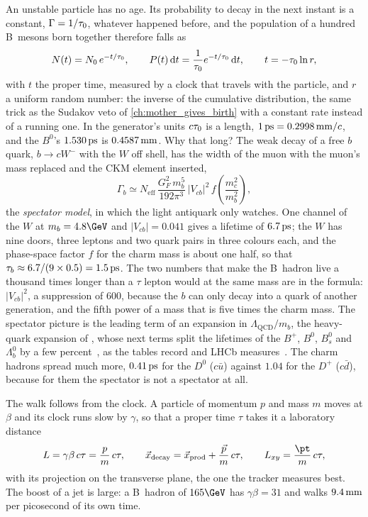 An unstable particle has no age. Its probability to decay in the next
instant is a constant, $\Gamma=1/\tau_0$, whatever happened before, and the
population of a hundred B~mesons born together therefore falls as
\begin{equation}
  N(t)=N_0\,e^{-t/\tau_0},\qquad
  P(t)\,\mathrm{d}t=\frac{1}{\tau_0}e^{-t/\tau_0}\,\mathrm{d}t,\qquad
  t=-\tau_0\ln r,
  \label{eq:children_producing_grandchildren:decay_law}
\end{equation}
with $t$ the proper time, measured by a clock that travels with the
particle, and $r$ a uniform random number: the inverse of the cumulative
distribution, the same trick as the Sudakov veto of
\cref{ch:mother_gives_birth} with a constant rate instead of a running
one. In the generator's units $c\tau_0$ is a length, $1\,\mathrm{ps}=0.2998\,\mathrm{mm}/c$,
and the $B^0$'s $1.530\,\mathrm{ps}$ is $0.4587\,\mathrm{mm}$. Why that long? The weak decay of
a free $b$ quark, $b\to cW^-$ with the $W$ off shell, has the width of the
muon with the muon's mass replaced and the CKM element inserted,
\begin{equation}
  \Gamma_b\simeq N_{\mathrm{eff}}\,\frac{G_F^2\,m_b^5}{192\pi^3}\,|V_{cb}|^2\,f\!\left(\frac{m_c^2}{m_b^2}\right),
  \label{eq:children_producing_grandchildren:spectator}
\end{equation}
the \emph{spectator model}, in which the light antiquark only watches.
One channel of the $W$ at $m_b=4.8\GeV$ and $|V_{cb}|=0.041$ gives a
lifetime of $6.7\,\mathrm{ps}$; the $W$ has nine doors, three leptons and two quark
pairs in three colours each, and the phase-space factor $f$ for the charm
mass is about one half, so that $\tau_b\approx6.7/(9\times0.5)=1.5\,\mathrm{ps}$.
The two numbers that make the B~hadron live a thousand times longer than
a $\tau$ lepton would at the same mass are in the formula: $|V_{cb}|^2$,
a suppression of $600$, because the $b$ can only decay into a quark of
another generation, and the fifth power of a mass that is five times the
charm mass. The spectator picture is the leading term of an expansion in
$\Lambda_{\mathrm{QCD}}/m_b$, the heavy-quark expansion of
\cite{Bigi:1992su,Manohar:1993qn,Neubert:1993mb}, whose next terms split
the lifetimes of the $B^+$, $B^0$, $B_s^0$ and $\Lambda_b^0$ by a few
percent~\cite{Neubert:1996we,Lenz:2014jha,Lenz:2022rbq}, as the tables
record and LHCb measures~\cite{LHCb:2014qsd}. The charm hadrons spread
much more, $0.41\,\mathrm{ps}$ for the $D^0$ ($c\bar u$) against $1.04$ for the
$D^+$ ($c\bar d$), because for them the spectator is not a spectator at
all.

The walk follows from the clock. A particle of momentum $p$ and mass $m$
moves at $\beta$ and its clock runs slow by $\gamma$, so that a proper
time $\tau$ takes it a laboratory distance
\begin{equation}
  L=\gamma\beta\,c\tau=\frac{p}{m}\,c\tau,\qquad
  \vec x_{\mathrm{decay}}=\vec x_{\mathrm{prod}}+\frac{\vec p}{m}\,c\tau,\qquad
  \Lxy=\frac{\pt}{m}\,c\tau,
  \label{eq:children_producing_grandchildren:flight}
\end{equation}
with \Lxy its projection on the transverse plane, the one the tracker
measures best. The boost of a jet is large: a B~hadron of $165\GeV$ has
$\gamma\beta=31$ and walks $9.4\,\mathrm{mm}$ per picosecond of its own time.

